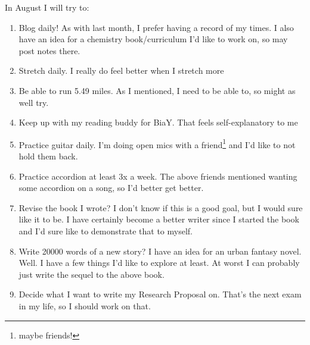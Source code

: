 \documentclass[12pt]{article}[titlepage]
\renewcommand{\,}{\textsuperscript{,}}
\begin{document}
In August I will try to:
\begin{enumerate}
\item Blog daily! As with last month, I prefer having a record of my times. I also have an idea for a chemistry book/curriculum I'd like to work on, so may post notes there.
\item Stretch daily. I really do feel better when I stretch more
\item Be able to run 5.49 miles. As I mentioned, I need to be able to, so might as well try.
\item Keep up with my reading buddy for BiaY. That feels self-explanatory to me
\item Practice guitar daily. I'm doing open mics with a friend\footnote{maybe friends!} and I'd like to not hold them back.
\item Practice accordion at least 3x a week. The above friends mentioned wanting some accordion on a song, so I'd better get better.
\item Revise the book I wrote? I don't know if this is a good goal, but I would sure like it to be. I have certainly become a better writer since I started the book and I'd sure like to demonstrate that to myself.
\item Write 20000 words of a new story? I have an idea for an urban fantasy novel. Well. I have a few things I'd like to explore at least. At worst I can probably just write the sequel to the above book.
\item Decide what I want to write my Research Proposal on. That's the next exam in my life, so I should work on that.
\end{enumerate}
\end{document}
